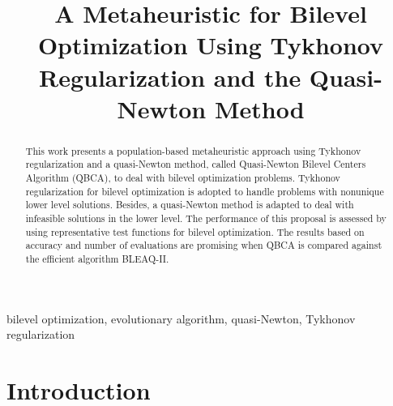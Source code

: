 \documentclass[conference]{IEEEtran}
\theoremstyle{definition}
\begin{document}
\title{A Metaheuristic for Bilevel Optimization Using Tykhonov Regularization and the Quasi-Newton Method}

\author{
\and
{}
}

\maketitle

\begin{abstract}
This work presents a population-based metaheuristic approach using Tykhonov
regularization and a quasi-Newton method, called Quasi-Newton Bilevel Centers
Algorithm (QBCA), to deal with bilevel optimization problems. Tykhonov regularization
for bilevel optimization is adopted to handle problems with nonunique lower level
solutions. Besides, a quasi-Newton method is adapted to deal with infeasible solutions
in the lower level. The performance of this proposal is assessed by using representative
test functions for bilevel optimization. The results based on accuracy and number
of evaluations are promising when QBCA is compared against the efficient algorithm
BLEAQ-II.
\end{abstract}

\begin{IEEEkeywords}
bilevel optimization, evolutionary algorithm, quasi-Newton, Tykhonov regularization
\end{IEEEkeywords}


\section{Introduction} %
\label{sec:introduction}

\end{document}
